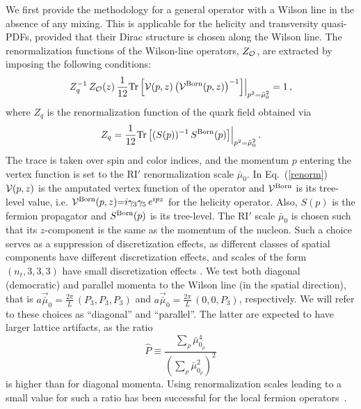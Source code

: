 \documentclass[12pt,tighten,nofootinbib,amssymb,floatfix]{article}
\newcommand{\be}{\begin{equation}}
\newcommand{\ee}{\end{equation}}
\begin{document}
We first provide the methodology for a general operator with a Wilson line in the absence of any mixing. This is applicable for the 
helicity and transversity quasi-PDFs, provided that their Dirac structure is chosen along the Wilson line. The renormalization functions of the 
Wilson-line operators, $Z_{\cal O}$, 
are extracted by imposing the following conditions:
\be
Z_q^{-1}\,Z_{\cal O}(z)\,\frac{1}{12} {\rm Tr} \left[{\cal V}(p,z) \left({\cal V}^{\rm Born}(p,z)\right)^{-1}\right] \Bigr|_{p^2=\bar\mu_0^2} = 1\, ,
\label{renorm}
\ee
where $Z_q$ is the renormalization function of the quark field obtained via
\be
Z_q = \frac{1}{12} {\rm Tr} \left[(S(p))^{-1}\, S^{\rm Born}(p)\right] \Bigr|_{p^2=\bar\mu_0^2}  \,.
\label{Zq_cond}
\ee
The trace is taken over spin and color indices, and the momentum $p$ entering the vertex function is set to the RI$'$ renormalization scale 
$\bar\mu_0$. In Eq.~(\ref{renorm}) ${\cal V}(p,z)$ is the amputated vertex function of the operator and ${\cal V}^{{\rm Born}}$ is its 
tree-level value, i.e. ${\cal V}^{{\rm Born}}(p,z) {=} i\gamma_3\gamma_5 \,e^{i p z}$ for the helicity operator. Also, $S(p)$ is the fermion 
propagator and $S^{{\rm Born}}(p)$ is its tree-level. The RI$'$ scale $\bar\mu_0$ is chosen such that its $z$-component is
the same as the momentum of the nucleon. Such a choice serves as a suppression of discretization effects, as different classes of spatial 
components have different discretization effects, and scales of the form $(n_t,3,3,3)$ have small discretization effects
\cite{Alexandrou:2015sea}. We test both diagonal (democratic) and parallel momenta to the Wilson line (in the spatial direction), that is 
$a\vec{\bar{\mu}}_0{=} \frac{2\pi}{L}\,(P_3,P_3,P_3)$ and $a\vec{\bar{\mu}}_0{=} \frac{2\pi}{L}\,(0,0,P_3)$, respectively. We will refer 
to these choices as ``diagonal'' and ``parallel''. The latter are expected to have larger lattice artifacts, as the ratio 
\be
\label{Phat}
\hat{P}{\equiv}\frac{\sum_\rho \bar\mu_{0_\rho}^4}{\left(\sum_\rho \bar\mu_{0_\rho}^2\right)^2}
\ee
 is higher than for diagonal momenta. Using renormalization scales leading to a small value for such a ratio has been successful for the local 
fermion operators~\cite{Constantinou:2010gr,Alexandrou:2010me}.
\end{document}
